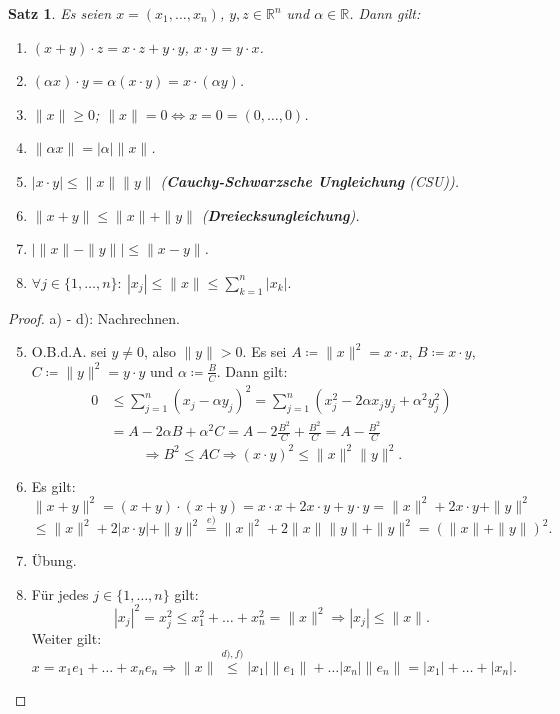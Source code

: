 \documentclass[12pt]{extreport} %
\newcommand{\R}{\mathbb{R}}
\theoremstyle{named}
\theoremstyle{itshape}
\newtheorem{satz}[unnamedtheorem]{Satz}
\theoremstyle{normal}
\begin{document}
{ 
\begin{satz} \label{14.1:satz}
	Es seien $x = (x_{1}, \dotsc, x_{n})$, $y, z \in \R^{n}$ und $\alpha \in \R$. Dann gilt:
	\begin{enumerate}
		\item $(x + y) \cdot z = x \cdot z + y \cdot y$, $x \cdot y = y \cdot x$.
		\item $(\alpha x) \cdot y = \alpha (x \cdot y) = x \cdot (\alpha y)$.
		\item $\| x \| \geq 0$; $\| x \| = 0 \iff x = 0 = (0, \dotsc, 0)$.
		\item $\| \alpha x \| = |\alpha| \| x \|$.
		\item $| x \cdot y | \leq \| x \| \| y \|$ (\textbf{Cauchy-Schwarzsche Ungleichung} (CSU)).
		\item $\| x + y\| \leq \| x \| + \| y \|$ (\textbf{Dreiecksungleichung}).
		\item $\left| \|x\| - \| y \| \right| \leq \| x - y \|$.
		\item $\forall j \in \{ 1, \dotsc, n \}: ~ |x_{j}| \leq \| x \| \leq \sum_{k=1}^{n} |x_{k}|.$
	\end{enumerate}
\end{satz}

\begin{proof}
	a) - d): Nachrechnen.
	\begin{enumerate} \setcounter{enumi}{4}
		\item O.B.d.A. sei $y \neq 0$, also $\| y \| > 0$. Es sei $A \coloneqq \| x \|^{2} = x \cdot x$, $B \coloneqq x \cdot y$, $C \coloneqq \| y \|^{2} = y \cdot y$ und
		$\alpha \coloneqq \frac{B}{C}$. Dann gilt:
			\begin{align*}
				0 & \leq \sum_{j=1}^{n} (x_{j} - \alpha y_{j})^{2} = \sum_{j=1}^{n} \left( x_{j}^{2} - 2\alpha x_{j} y_{j} + \alpha^{2} y_{j}^{2} \right) \\
				  & = A - 2 \alpha B + \alpha^{2} C = A - 2 \frac{B^{2}}{C} + \frac{B^{2}}{C} = A - \frac{B^{2}}{C} 	
			\end{align*}
			$$\Rightarrow B^{2} \leq AC \Rightarrow (x \cdot y)^{2} \leq \|x\|^{2} \|y\|^{2}.$$
		\item Es gilt: $$\|x + y \|^{2} = (x + y) \cdot (x + y) = x \cdot x + 2 x \cdot y + y \cdot y = \| x \|^{2} + 2x \cdot y + \| y \|^{2}$$
			$$  \leq \| x \|^{2} + 2 | x \cdot y | + \| y \|^{2} \overset{e)}{=} \| x \|^{2} + 2 \| x \| \| y \| + \| y \|^{2} = \left( \| x \|+ \| y \| \right)^{2}. $$
		\item Übung.
		\item Für jedes $j \in \{1,\dotsc,n\}$ gilt:
		        $$|x_{j}|^{2} = x_{j}^{2} \leq x_{1}^{2} + \dotsc + x_{n}^{2} = \|x\|^{2} \Rightarrow |x_{j}| \leq \| x \|.$$
		      Weiter gilt: 
			$$ x = x_{1} e_{1} + \dotsc + x_{n} e_{n} \Rightarrow \| x \| 
			\overset{d),f)}{\le} |x_{1}| \| e_{1} \| + \dotsc |x_{n}| \| e_{n} \| = |x_{1}| + \dotsc + |x_{n}|. $$
	\end{enumerate}
\end{proof}

}
\end{document}
